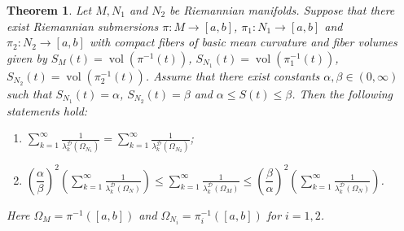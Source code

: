 \documentclass{amsart}
\newtheorem{theorem}{Theorem}[section]
\theoremstyle{definition}
\theoremstyle{remark}
\numberwithin{equation}{section}
\begin{document}
\begin{theorem}\label{thm:comparison} Let $M, N_1$ and $N_2$ be Riemannian manifolds. Suppose that there exist Riemannian submersions $\pi \colon M \to [a,b]$, $\pi_1\colon N_1 \to [a,b]$ and $\pi_2 \colon N_2 \to [a,b]$ with compact fibers of basic mean curvature and fiber volumes given by $S_M(t)=\operatorname{vol}(\pi^{-1}(t))$, $S_{N_1}(t)=\operatorname{vol}(\pi_1^{-1}(t))$, $S_{N_2}(t)=\operatorname{vol}(\pi_2^{-1}(t))$. Assume that there exist constants $\alpha, \beta \in (0,\infty)$ such that $S_{N_1}(t)=\alpha$, $S_{N_2}(t)=\beta$ and $\alpha \leq S(t) \leq \beta$. Then the following statements hold:
\begin{enumerate}
 \item $\displaystyle  \sum_{k=1}^{\infty}\frac{1}{\lambda_k^{\mathcal{D}}(\Omega_{N_1})} =  \sum_{k=1}^{\infty}\frac{1}{\lambda_k^{\mathcal{D}}(\Omega_{N_2})}$;
 \item $\displaystyle\left( \dfrac{\alpha}{\beta} \right)^2 \left(  \sum_{k=1}^{\infty}\frac{1}{\lambda_k^{\mathcal{D}}(\Omega_N)} \right) \leq  \sum_{k=1}^{\infty}\frac{1}{\lambda_k^{\mathcal{D}}(\Omega_M)} \leq \left( \dfrac{\beta}{\alpha} \right)^2 \left(  \sum_{k=1}^{\infty}\frac{1}{\lambda_k^{\mathcal{D}}(\Omega_N)}\right)$.
\end{enumerate}
Here $\Omega_M = \pi^{-1}([a,b])$ and $\Omega_{N_i} = \pi_i^{-1}([a,b])$ for $i=1,2$.
\end{theorem}
\end{document}
